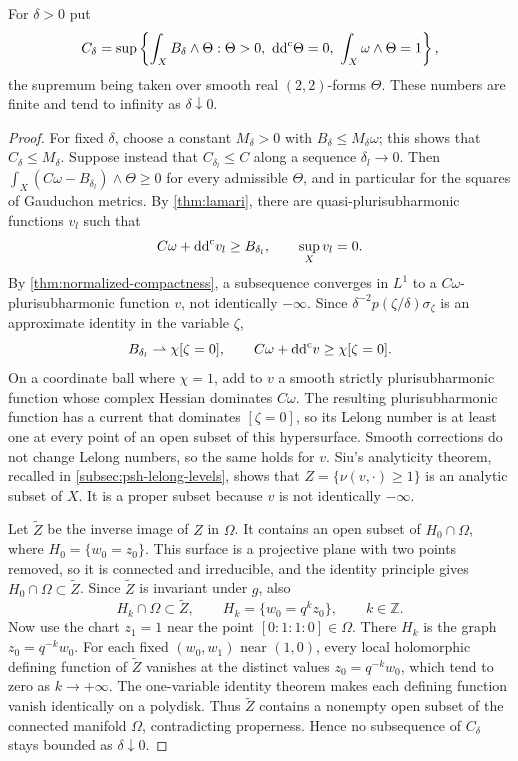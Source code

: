\begin{lemma}\label{lem:lower-mass-trace-concentration}
For $\delta>0$ put
\[
 C_\delta=\sup\left\{\int_XB_\delta\wedge\Theta:
 \Theta>0,\ \ddc\Theta=0,\ \int_X\omega\wedge\Theta=1\right\},
\]
the supremum being taken over smooth real $(2,2)$-forms $\Theta$. These numbers are finite and tend to infinity as $\delta\downarrow0$.
\end{lemma}
\begin{proof}
For fixed $\delta$, choose a constant $M_\delta>0$ with $B_\delta\leq M_\delta\omega$; this shows that $C_\delta\leq M_\delta$. Suppose instead that $C_{\delta_l}\leq C$ along a sequence $\delta_l\to0$. Then $\int_X(C\omega-B_{\delta_l})\wedge\Theta\geq0$ for every admissible $\Theta$, and in particular for the squares of Gauduchon metrics. By \cref{thm:lamari}, there are quasi-plurisubharmonic functions $v_l$ such that
\[
 C\omega+\mathrm{dd}^{\mathrm{c}} v_l\geq B_{\delta_l},\qquad \sup_Xv_l=0.
\]
By \cref{thm:normalized-compactness}, a subsequence converges in $L^1$ to a $C\omega$-plurisubharmonic function $v$, not identically $-\infty$. Since $\delta^{-2}p(\zeta/\delta)\sigma_\zeta$ is an approximate identity in the variable $\zeta$,
\[
 B_{\delta_l}\rightharpoonup\chi[\zeta=0],\qquad
 C\omega+\mathrm{dd}^{\mathrm{c}} v\geq\chi[\zeta=0].
\]
On a coordinate ball where $\chi=1$, add to $v$ a smooth strictly plurisubharmonic function whose complex Hessian dominates $C\omega$. The resulting plurisubharmonic function has a current that dominates $[\zeta=0]$, so its Lelong number is at least one at every point of an open subset of this hypersurface. Smooth corrections do not change Lelong numbers, so the same holds for $v$. Siu's analyticity theorem, recalled in \cref{subsec:psh-lelong-levels}, shows that
$Z=\{\nu(v,\cdot)\geq1\}$ is an analytic subset of $X$. It is a proper subset because $v$ is not identically $-\infty$.

Let $\widetilde Z$ be the inverse image of $Z$ in $\Omega$. It contains an open subset of
$H_0\cap\Omega$, where $H_0=\{w_0=z_0\}$. This surface is a projective plane with two points removed, so it is connected and irreducible, and the identity principle gives $H_0\cap\Omega\subset\widetilde Z$. Since $\widetilde Z$ is invariant under $g$, also
\[
 H_k\cap\Omega\subset\widetilde Z,\qquad H_k=\{w_0=q^kz_0\},
 \qquad k\in\mathbb Z.
\]
Now use the chart $z_1=1$ near the point $[0:1:1:0]\in\Omega$. There $H_k$ is the graph $z_0=q^{-k}w_0$. For each fixed $(w_0,w_1)$ near $(1,0)$, every local holomorphic defining function of $\widetilde Z$ vanishes at the distinct values $z_0=q^{-k}w_0$, which tend to zero as $k\to+\infty$. The one-variable identity theorem makes each defining function vanish identically on a polydisk. Thus $\widetilde Z$ contains a nonempty open subset of the connected manifold $\Omega$, contradicting properness. Hence no subsequence of $C_\delta$ stays bounded as $\delta\downarrow0$.
\end{proof}

